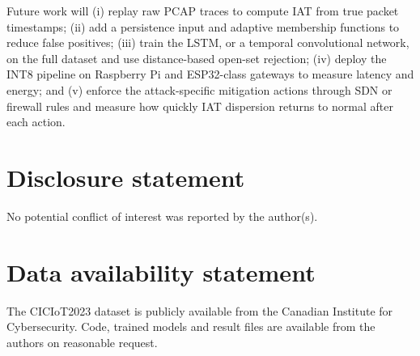 \documentclass[]{interact}
\theoremstyle{plain}
\theoremstyle{definition}
\begin{document}
Future work will (i) replay raw PCAP traces to compute IAT from true packet timestamps; (ii) add a persistence input and adaptive membership functions to reduce false positives; (iii) train the LSTM, or a temporal convolutional network, on the full dataset and use distance-based open-set rejection; (iv) deploy the INT8 pipeline on Raspberry Pi and ESP32-class gateways to measure latency and energy; and (v) enforce the attack-specific mitigation actions through SDN or firewall rules and measure how quickly IAT dispersion returns to normal after each action.

\section*{Disclosure statement}
No potential conflict of interest was reported by the author(s).

\section*{Data availability statement}
The CICIoT2023 dataset is publicly available from the Canadian Institute for Cybersecurity. Code, trained models and result files are available from the authors on reasonable request.
\end{document}
